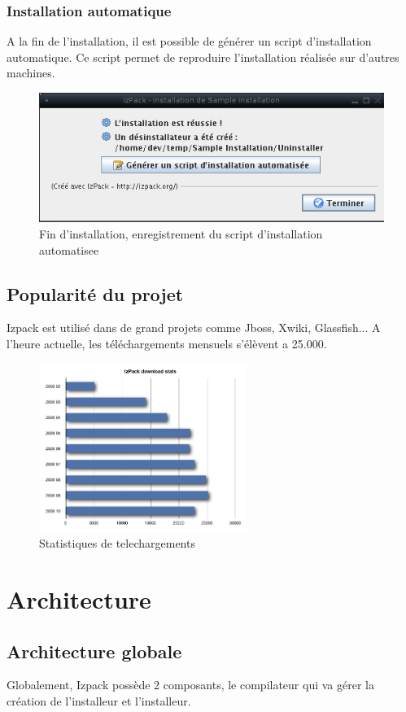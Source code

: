 \subsubsection{Installation automatique}
A la fin de l'installation, il est possible de générer un script d'installation automatique. Ce script permet de reproduire l'installation réalisée sur d'autres machines.
\begin{figure}[H]
	\centering
	\includegraphics[width=12cm]{../image/SaveInstallXML.png}
	\caption{Fin d'installation, enregistrement du script d'installation automatisee}
\end{figure}
\subsection{Popularité du projet}
Izpack est utilisé dans de grand projets comme Jboss, Xwiki, Glassfish... A l'heure actuelle, les téléchargements mensuels s'élèvent a 25.000.
\begin{figure}[H]
	\centering
	\includegraphics[width=0.6\textwidth]{../image/telechargements.png}
	\caption{Statistiques de telechargements}
\end{figure}
\section{Architecture}
\subsection{Architecture globale}
Globalement, Izpack possède 2 composants, le compilateur qui va gérer la création de l'installeur et l'installeur.
